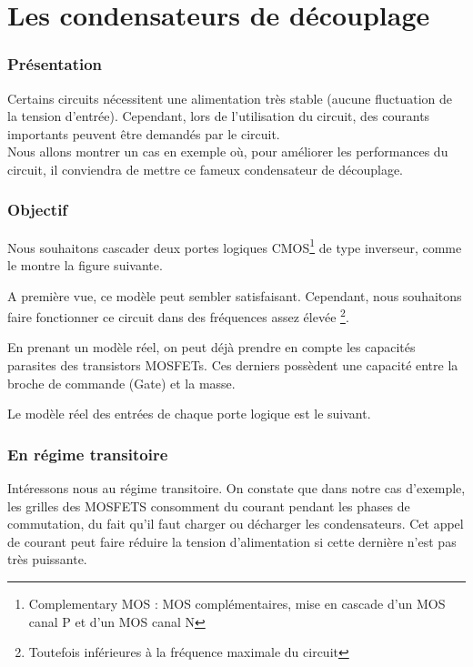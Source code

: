 \section{Les condensateurs de découplage}

\subsubsection{Présentation}


Certains circuits nécessitent une alimentation très stable (aucune fluctuation de la tension d'entrée). 
Cependant, lors de l'utilisation du circuit, des courants importants peuvent être demandés par le circuit. \\
Nous allons montrer un cas en exemple où, pour améliorer les performances du circuit, il conviendra 
de mettre ce fameux condensateur de découplage.

\subsubsection{Objectif}

Nous souhaitons cascader deux portes logiques CMOS\footnote{Complementary MOS : MOS complémentaires, mise en cascade d'un MOS canal P et d'un MOS canal N} de type inverseur, comme le montre la figure suivante.


A première vue, ce modèle peut sembler satisfaisant. Cependant, nous souhaitons faire fonctionner ce circuit dans des fréquences assez élevée \footnote{Toutefois inférieures à la fréquence maximale du circuit}.

En prenant un modèle réel, on peut déjà prendre en compte les capacités parasites des transistors MOSFETs. Ces derniers possèdent une capacité entre la broche de commande (Gate) et la masse.

Le modèle réel des entrées de chaque porte logique est le suivant.



\subsubsection{En régime transitoire}
Intéressons nous au régime transitoire.
On constate que dans notre cas d'exemple, les grilles des  MOSFETS consomment du courant pendant les phases de commutation, du fait qu'il faut charger ou décharger les condensateurs.
Cet appel de courant peut faire réduire la tension d'alimentation si cette dernière n'est pas très puissante.


